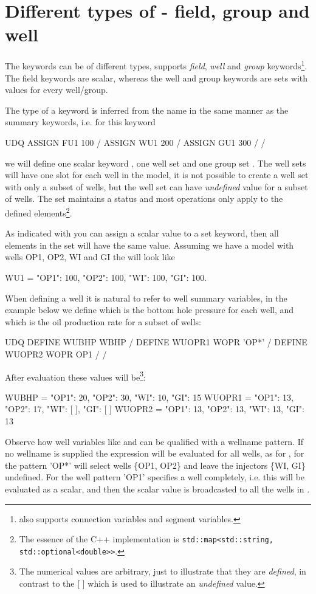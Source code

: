 \section{Different types of \udq{} - field, group and well}
The \udq{} keywords can be of different types, \flow{} supports \emph{field},
\emph{well} and \emph{group} keywords\footnote{\eclipse{} also supports
connection variables and segment variables.}. The field keywords are scalar,
whereas the well and group keywords are sets with values for every well/group.

The type of a \udq{} keyword is inferred from the name in the same manner as the
summary keywords, i.e. for this \udq{} keyword
\begin{deck}
UDQ
  ASSIGN FU1 100 /
  ASSIGN WU1 200 /
  ASSIGN GU1 300 /
/
\end{deck}
we will define one scalar keyword , one well set  and one
group set . The well sets will have one slot for each well in the model,
it is not possible to create a well set with only a subset of wells, but the
well set can have \emph{undefined} value for a subset of wells. The set
maintains a  status and most operations
only apply to the defined elements\footnote{The essence of the C++
implementation is \texttt{std::map<std::string, std::optional<double>>}.}.

As indicated with  you can assign a scalar value to a set
keyword, then all elements in the set will have the same value. Assuming we have
a model with wells OP1, OP2, WI and GI the  will look like
\begin{code}
  WU1 = {"OP1": 100, "OP2": 100, "WI": 100, "GI": 100}.
\end{code}
When defining a well \udq{} it is natural to refer to well summary variables, in
the example below we define  which is the bottom hole pressure
for each well, and  which is the oil production rate for a subset of
wells:
\begin{deck}
UDQ
  DEFINE WUBHP  WBHP     / 
  DEFINE WUOPR1 WOPR 'OP*' /
  DEFINE WUOPR2 WOPR OP1 /
/
\end{deck}
After evaluation these \udq{} values will be\footnote{The numerical values are
arbitrary, just to illustrate that they are \emph{defined}, in contrast to the
[ ] which is used to illustrate an \emph{undefined} value.}:
\begin{code}
  WUBHP  = {"OP1": 20, "OP2": 30, "WI": 10,  "GI": 15}
  WUOPR1 = {"OP1": 13, "OP2": 17, "WI": [ ], "GI": [ ]}
  WUOPR2 = {"OP1": 13, "OP2": 13, "WI": 13,  "GI": 13}
\end{code}
Observe how well variables like  and  can be qualified with a
wellname pattern. If no wellname is supplied the expression will be evaluated
for all wells, as for , for  the pattern 'OP*' will select
wells \{OP1, OP2\} and leave the injectors \{WI, GI\} undefined. For 
the well pattern 'OP1' specifies a well completely, i.e. this will be evaluated
as a scalar, and then the scalar value  is
broadcasted to all the wells in .

